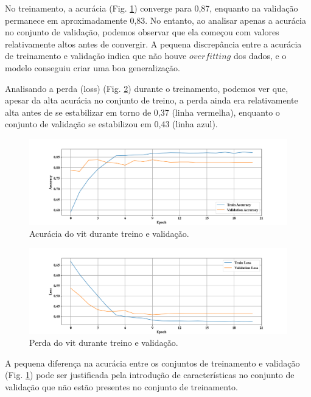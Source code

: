 No treinamento, a acurácia (Fig. \ref{fig:acc}) converge para 0,87, enquanto na validação permanece em aproximadamente 0,83. No entanto, ao analisar apenas a acurácia no conjunto de validação, podemos observar que ela começou com valores relativamente altos antes de convergir. A pequena discrepância entre a acurácia de treinamento e validação indica que não houve $overfitting$ dos dados, e o modelo conseguiu criar uma boa generalização.

Analisando a perda (loss) (Fig. \ref{fig:loss}) durante o treinamento, podemos ver que, apesar da alta acurácia no conjunto de treino, a perda ainda era relativamente alta antes de se estabilizar em torno de 0,37 (linha vermelha), enquanto o conjunto de validação se estabilizou em 0,43 (linha azul).

\begin{figure}[tb]
\centerline{\includegraphics[width=1\linewidth]{images/resultados/sgd_accuracy.png}}
\caption{Acurácia do \acrshort{vit} durante treino e validação.}
\label{fig:acc}
\end{figure}

\begin{figure}[tb]
\centerline{\includegraphics[width=1\linewidth]{images/resultados/sgd_loss.png}}
\caption{Perda do \acrshort{vit} durante treino e validação.}
\label{fig:loss}
\end{figure}

A pequena diferença na acurácia entre os conjuntos de treinamento e validação (Fig. \ref{fig:acc}) pode ser justificada pela introdução de 
características no conjunto de validação que não estão presentes no conjunto de treinamento. 
